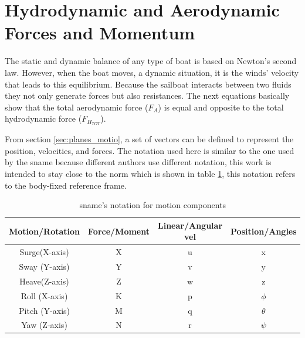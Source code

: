\section{Hydrodynamic and Aerodynamic Forces and Momentum} \label{section:forces_moment}
The static and dynamic balance of any type of boat is based on Newton's second law. However, when the boat moves, a dynamic situation, it is the winds' velocity that leads to this equilibrium. Because the sailboat interacts between two fluids they not only generate forces but also resistances.
The next equations basically show that the total aerodynamic force ($F_{A}$) is equal and opposite to the total hydrodynamic force ($F_{H_{TOT}}$). \par
From section \ref{sec:planes_motio}, a set of vectors can be defined to represent the position, velocities, and forces. The notation used here is similar to the one used by the \acrfull{sname} %
because different authors use different notation, this work is intended to stay close to the norm which is shown in table \ref{table:SNAME_notation}, this notation refers to the body-fixed reference frame.
\begin{table}%
    \centering
    \begin{tabular}{c|c|c|c}
    \hline
          Motion/Rotation & Force/Moment & Linear/Angular vel & Position/Angles   \\
    \hline 
         Surge(X-axis) & X & u & x \\  
         Sway (Y-axis) & Y & v & y \\
         Heave(Z-axis) & Z & w & z \\
         Roll (X-axis) & K & p & $\phi$ \\
         Pitch (Y-axis) & M & q & $\theta$\\
         Yaw (Z-axis) & N & r & $\psi$\\
    \end{tabular}
    \caption{\acrshort{sname}'s notation for motion components \cite{Alves2014ASailboat}}
    \label{table:SNAME_notation}
\end{table}


